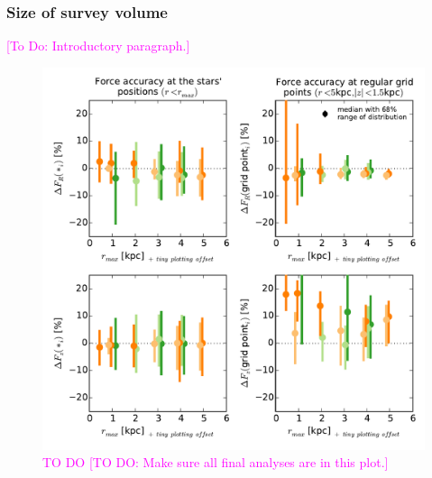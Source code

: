 \documentclass[iop,revtex4,numberedappendix,appendixfloats]{emulateapj}
\newcommand{\Wilma}[1]{\textcolor{Magenta}{#1}}
\begin{document}
\subsubsection{Size of survey volume}

\Wilma{[To Do: Introductory paragraph.]}

\begin{figure}[!htbp]
\centering
\includegraphics[width=\columnwidth]{fig/MNdHHdiffSph2_bias_in_forces_recovery.pdf}
\caption{\Wilma{TO DO} \Wilma{[TO DO: Make sure all final analyses are in this plot.]}}
\label{fig:forces_bias}
\end{figure}
\end{document}
